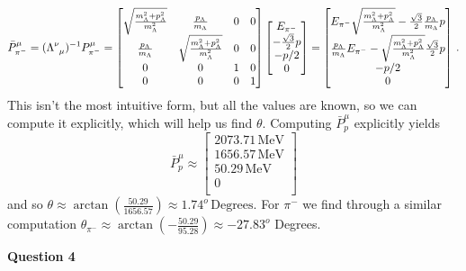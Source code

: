 \documentclass[10pt]{article}
\begin{document}
\[ \bar{P}_{\pi^{-}}^{\mu} = (\tensor{\Lambda}{^{\nu}_{\mu}})^{-1}P_{\pi^{-}}^{\mu} =
\begin{bmatrix}
  \sqrt{\frac{m_{\Lambda}^{2} + p_{\Lambda}^{2}}{m_{\Lambda}^{2}}} & \frac{p_{\Lambda}}{m_{\Lambda}} & 0  & 0 \\
  \frac{p_{\Lambda}}{m_{\Lambda}} &  \sqrt{\frac{m_{\Lambda}^{2} + p_{\Lambda}^{2}}{m_{\Lambda}^{2}}} & 0 & 0 \\
  0 & 0 & 1 & 0 \\
  0 & 0 & 0 & 1 \\
\end{bmatrix}
\begin{bmatrix}
  E_{\pi^{-}} \\
  -\frac{\sqrt{3}}{2} p \\
  -p/2 \\
  0 \\
\end{bmatrix}
=
\begin{bmatrix}
  E_{\pi^{-}}\sqrt{\frac{m_{\Lambda}^{2} + p_{\Lambda}^{2}}{m_{\Lambda}^{2}}} - \frac{\sqrt{3}}{2}\frac{p_{\Lambda}}{m_{\Lambda}}p \\
  \frac{p_{\Lambda}}{m_{\Lambda}}E_{\pi^{-}} - \sqrt{\frac{m_{\Lambda}^{2} + p_{\Lambda}^{2}}{m_{\Lambda}^{2}}}\frac{\sqrt{3}}{2} p \\
  -p/2 \\
  0 \\
\end{bmatrix}
\, .
\]
This isn't the most intuitive form, but all the values are known, so we can compute it explicitly, which will help us find $\theta$. Computing $\bar{P}_{p}^{\mu}$ explicitly yields
\[ \bar{P}_{p}^{\mu} \approx
\begin{bmatrix}
  2073.71 \, \text{MeV} \\
  1656.57 \, \text{MeV} \\
  50.29 \, \text{MeV} \\
  0 \\
\end{bmatrix}
\]
and so $\theta \approx \arctan\left(\frac{50.29}{1656.57}\right) \approx 1.74^{o} \, \text{Degrees}$. For $\pi^{-}$ we find through a similar computation $\theta_{\pi^{-}} \approx \arctan\left(-\frac{50.29}{95.28}\right) \approx -27.83^{o}$ Degrees. 

\textbf{Question 4}
\end{document}
